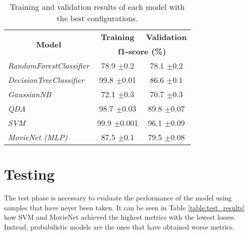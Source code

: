 \documentclass[../main]{subfiles}
\begin{document}
\begin{table}[!ht]
    \center
    \begin{tabular}{|l|cc|}
        \hline
        \multicolumn{1}{|c|}{\multirow{2}{*}{\textbf{Model}}} & \multicolumn{1}{c|}{\textbf{Training}} & \multicolumn{1}{l|}{\textbf{Validation}} \\
        \cline{2-3} 
        \multicolumn{1}{|c|}{}                                & \multicolumn{2}{c|}{\textbf{f1-score (\%)}}                                       \\
        \hline
        \textit{RandomForestClassifier}                       & \multicolumn{1}{c|}{78.9 $\pm$0.2}         & 78.1 $\pm$0.2                                \\
        \hline
        \textit{DecisionTreeClassifier}                       & \multicolumn{1}{c|}{99.8 $\pm$0.01}        & 86.6 $\pm$0.1                                \\
        \hline
        \textit{GaussianNB}                                   & \multicolumn{1}{c|}{72.1 $\pm$0.3}         & 70.7 $\pm$0.3                                \\
        \hline
        \textit{QDA}                                          & \multicolumn{1}{c|}{98.7 $\pm$0.03}        & 89.8 $\pm$0.07                               \\
        \hline
        \textit{SVM}                                          & \multicolumn{1}{c|}{99.9 $\pm$0.001}       & 96.1 $\pm$0.09                               \\
        \hline
        \textit{MovieNet (MLP)}                               & \multicolumn{1}{c|}{87.5 $\pm$0.1}         & 79.5 $\pm$0.08                               \\
        \hline
    \end{tabular}
    \caption{Training and validation results of each model with the best configurations.}
    \label{table:train_val_results}
\end{table}
\newpage

\section{Testing}
The test phase is necessary to evaluate the performance of the model using samples that have never been taken.
It can be seen in Table \ref{table:test_results} how SVM and MovieNet achieved the highest metrics with the lowest losses.
Instead, probabilistic models are the ones that have obtained worse metrics.
\end{document}
